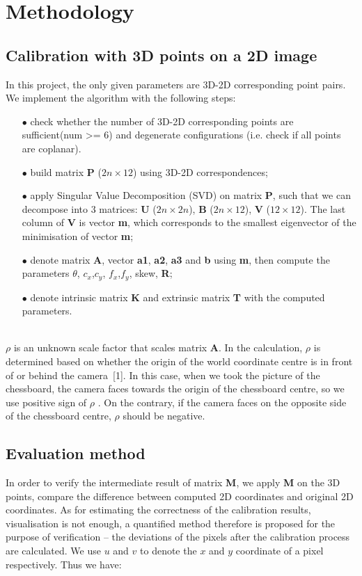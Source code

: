 \documentclass[a4paper]{article}
\begin{document}
\section{Methodology}
\subsection{Calibration with 3D points on a 2D image}
In this project, the only given parameters are 3D-2D corresponding point pairs. We implement the algorithm with the following steps:
\begin{itemize}
\item[$\bullet$] check whether the number of 3D-2D corresponding points are sufficient(num >= 6) and degenerate configurations (i.e. check if all points are coplanar).
\item[$\bullet$] build matrix \textbf{P} ($2n\times12$) using 3D-2D correspondences; 
\item[$\bullet$] apply Singular Value Decomposition (SVD) on matrix \textbf{P}, such that we can decompose into 3 matrices: \textbf{U} ($2n\times2n$), \textbf{B} ($2n\times12$), \textbf{V} ($12\times12$). The last column of \textbf{V} is vector \textbf{m}, which corresponds to the smallest eigenvector of the minimisation of vector \textbf{m};
\item[$\bullet$] denote matrix \textbf{A}, vector \textbf{a1}, \textbf{a2}, \textbf{a3} and \textbf{b} using \textbf{m}, then compute the parameters $\theta$, $c_x$,$c_y$, $f_x$,$f_y$, skew, \textbf{R};
\item[$\bullet$] denote intrinsic matrix \textbf{K} and extrinsic matrix \textbf{T} with the computed parameters.
\end{itemize}
\\
$\rho $ is an unknown scale factor that scales matrix \textbf{A}. In the calculation, $\rho$ is determined based on whether the origin of the world coordinate centre is in front of or behind the camera\ [1]. In this case, when we took the 
picture of the chessboard, the camera faces towards the origin of the chessboard centre, so we use positive sign of  $\rho$ . On the contrary, if the camera faces on the opposite side of the chessboard centre, $\rho$ should be negative.

\subsection{Evaluation method}
In order to verify the intermediate result of matrix \textbf{M}, we apply \textbf{M} on the 3D points, compare the difference between computed 2D coordinates and original 2D coordinates. As for estimating the correctness of the calibration results, visualisation is not enough, a quantified method therefore is proposed for the purpose of verification -- the deviations of the pixels after the calibration process are calculated. We use $u$ and $v$ to denote the $x$ and $y$ coordinate of a pixel respectively. Thus we have:
\end{document}
